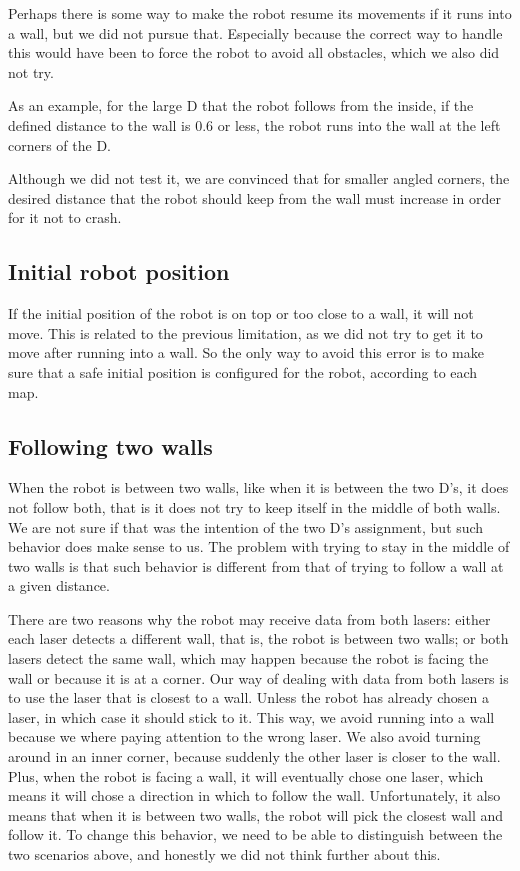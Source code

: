 \documentclass[10pt,journal,compsoc]{IEEEtran}
\begin{document}
Perhaps there is some way to make the robot resume its movements if it runs into a wall, but we did not pursue that. Especially because the correct way to handle this would have been to force the robot to avoid all obstacles, which we also did not try.

As an example, for the large D that the robot follows from the inside, if the defined distance to the wall is 0.6 or less, the robot runs into the wall at the left corners of the D.

Although we did not test it, we are convinced that for smaller angled corners, the desired distance that the robot should keep from the wall must increase in order for it not to crash.

\subsection{Initial robot position}

If the initial position of the robot is on top or too close to a wall, it will not move. This is related to the previous limitation, as we did not try to get it to move after running into a wall. So the only way to avoid this error is to make sure that a safe initial position is configured for the robot, according to each map.

\subsection{Following two walls}

When the robot is between two walls, like when it is between the two D's, it does not follow both, that is it does not try to keep itself in the middle of both walls. We are not sure if that was the intention of the two D's assignment, but such behavior does make sense to us. The problem with trying to stay in the middle of two walls is that such behavior is different from that of trying to follow a wall at a given distance. 

There are two reasons why the robot may receive data from both lasers: either each laser detects a different wall, that is, the robot is between two walls; or both lasers detect the same wall, which may happen because the robot is facing the wall or because it is at a corner. Our way of dealing with data from both lasers is to use the laser that is closest to a wall. Unless the robot has already chosen a laser, in which case it should stick to it. This way, we avoid running into a wall because we where paying attention to the wrong laser. We also avoid turning around in an inner corner, because suddenly the other laser is closer to the wall. Plus, when the robot is facing a wall, it will eventually chose one laser, which means it will chose a direction in which to follow the wall. Unfortunately, it also means that when it is between two walls, the robot will pick the closest wall and follow it. To change this behavior, we need to be able to distinguish between the two scenarios above, and honestly we did not think further about this.
\end{document}
